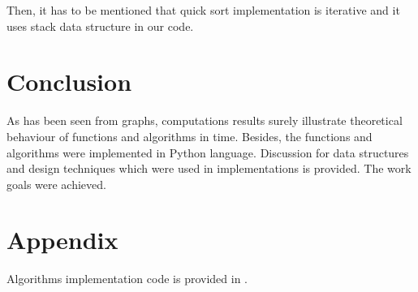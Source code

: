 \documentclass[12pt, bachelor, substylefile = algo_title.rtx]{disser}
\theoremstyle{definition}
\begin{document}
Then, it has to be mentioned that quick sort implementation is iterative and it uses stack data structure in our code.



\section{Conclusion}
As has been seen from graphs, computations results surely illustrate theoretical behaviour of functions and algorithms in time. Besides, the functions and algorithms were implemented in Python language. Discussion for data structures and design techniques which were used in implementations is provided. The work goals were achieved.

\section{Appendix}
Algorithms implementation code is provided in \cite{repogithub}.

{\small }

\end{document}
